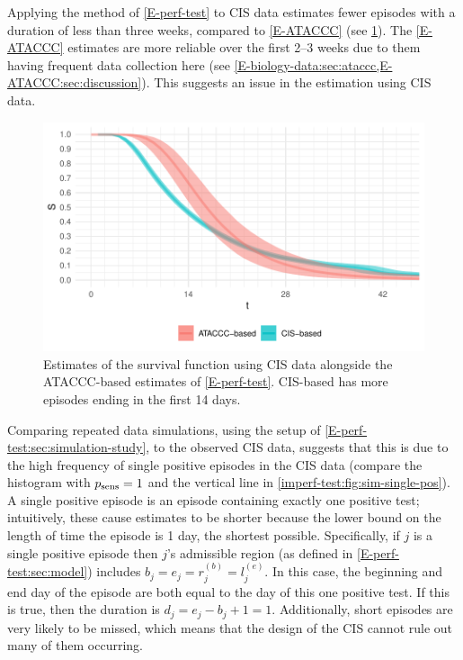 \documentclass[thesis.tex]{subfiles}
\begin{document}
Applying the method of \cref{E-perf-test} to CIS data estimates fewer episodes with a duration of less than three weeks, compared to \cref{E-ATACCC} (see \cref{imperf-test:fig:problem-cis-estimates}).
The \cref{E-ATACCC} estimates are more reliable over the first 2--3 weeks due to them having frequent data collection here (see \cref{E-biology-data:sec:ataccc,E-ATACCC:sec:discussion}).
This suggests an issue in the estimation using CIS data.
\begin{figure}
  \centering \includegraphics{cis-imperfect-testing/CIS_perfect}
  \caption[Estimating survival using CIS data assuming perfect testing]{Estimates of the survival function using CIS data alongside the ATACCC-based estimates of \cref{E-perf-test}. CIS-based has more episodes ending in the first 14 days. \label{imperf-test:fig:problem-cis-estimates}}
\end{figure}

Comparing repeated data simulations, using the setup of \cref{E-perf-test:sec:simulation-study}, to the observed CIS data, suggests that this is due to the high frequency of single positive episodes in the CIS data (compare the histogram with $p_\text{sens}=1$ and the vertical line in \cref{imperf-test:fig:sim-single-pos}).
A single positive episode is an episode containing exactly one positive test; intuitively, these cause estimates to be shorter because the lower bound on the length of time the episode is 1 day, the shortest possible.
Specifically, if $j$ is a single positive episode then $j$'s admissible region (as defined in \cref{E-perf-test:sec:model}) includes $b_j = e_j = r_j^{(b)} = l_j^{(e)}$.
In this case, the beginning and end day of the episode are both equal to the day of this one positive test.
If this is true, then the duration is $d_j = e_j - b_j + 1 = 1$.
Additionally, short episodes are very likely to be missed, which means that the design of the CIS cannot rule out many of them occurring.
\end{document}
